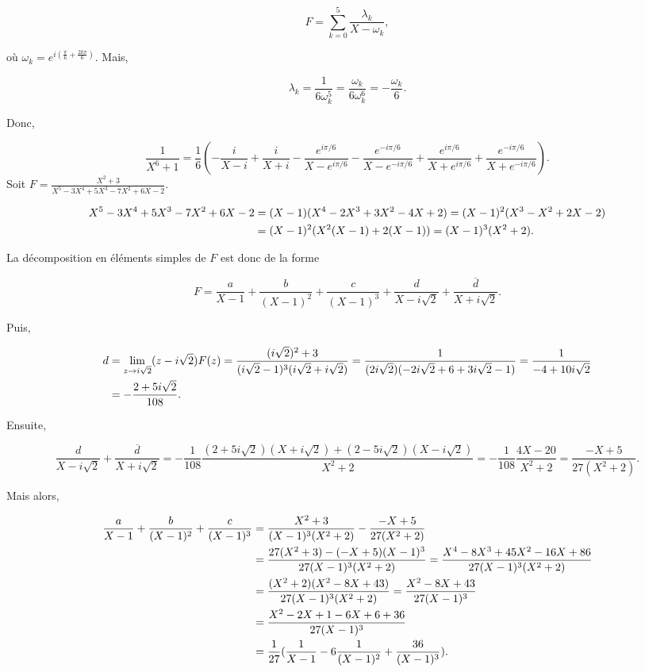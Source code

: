{{$$F=\sum_{k=0}^{5}\frac{\lambda_k}{X-\omega_k},$$ 

où $\omega_k=e^{i(\frac{\pi}{6}+\frac{2k\pi}{6})}$. Mais, 

$$\lambda_k=\frac{1}{6\omega_k^5}=\frac{\omega_k}{6\omega_k^6}=-\frac{\omega_k}{6}.$$

Donc,

$$\frac{1}{X^6+1}=\frac{1}{6}(-\frac{i}{X-i}+\frac{i}{X+i}-\frac{e^{i\pi/6}}{X-e^{i\pi/6}}-\frac{e^{-i\pi/6}}{X-e^{-i\pi/6}}+
\frac{e^{i\pi/6}}{X+e^{i\pi/6}}+\frac{e^{-i\pi/6}}{X+e^{-i\pi/6}}).$$
Soit $F=\frac{X^2+3}{X^5-3X^4+5X^3-7X^2+6X-2}$.

\begin{align*}\ensuremath
X^5-3X^4+5X^3-7X^2+6X-2&=(X-1)(X^4-2X^3+3X^2-4X+2)=(X-1)^2(X^3-X^2+2X-2)\\
 &= (X-1)^2(X^2(X-1)+2(X-1))=(X-1)^3(X^2+2).
\end{align*}

La décomposition en éléments simples de $F$ est donc de la forme

$$F=\frac{a}{X-1}+\frac{b}{(X-1)^2}+\frac{c}{(X-1)^3}+\frac{d}{X-i\sqrt{2}}+\frac{\overline{d}}{X+i\sqrt{2}}.$$

Puis,

\begin{align*}\ensuremath
d&=\lim_{z \rightarrow i\sqrt{2}}(z-i\sqrt{2})F(z)=\frac{(i\sqrt{2})^2+3}{(i\sqrt{2}-1)^3(i\sqrt{2}+i\sqrt{2})}=
\frac{1}{(2i\sqrt{2})(-2i\sqrt{2}+6+3i\sqrt{2}-1)}=\frac{1}{-4+10i\sqrt{2}}\\
 &=-\frac{2+5i\sqrt{2}}{108}.
\end{align*}

Ensuite,

$$\frac{d}{X-i\sqrt{2}}+\frac{\overline{d}}{X+i\sqrt{2}}=-\frac{1}{108}\frac{(2+5i\sqrt{2})(X+i\sqrt{2})+
(2-5i\sqrt{2})(X-i\sqrt{2})}{X^2+2}=-\frac{1}{108}\frac{4X-20}{X^2+2}=\frac{-X+5}{27(X^2+2)}.$$

Mais alors,

\begin{align*}\ensuremath
\frac{a}{X-1}+\frac{b}{(X-1)^2}+\frac{c}{(X-1)^3}&=\frac{X^2+3}{(X-1)^3(X^2+2)}-\frac{-X+5}{27(X^2+2)}\\
 &=\frac{27(X^2+3)-(-X+5)(X-1)^3}{27(X-1)^3(X^2+2)}=\frac{X^4-8X^3+45X^2-16X+86}{27(X-1)^3(X^2+2)}\\
 &=\frac{(X^2+2)(X^2-8X+43)}{27(X-1)^3(X^2+2)}=\frac{X^2-8X+43}{27(X-1)^3}\\
 &=\frac{X^2-2X+1-6X+6+36}{27(X-1)^3}\\
 &=\frac{1}{27}(\frac{1}{X-1}-6\frac{1}{(X-1)^2}+\frac{36}{(X-1)^3}).
\end{align*}

}}
